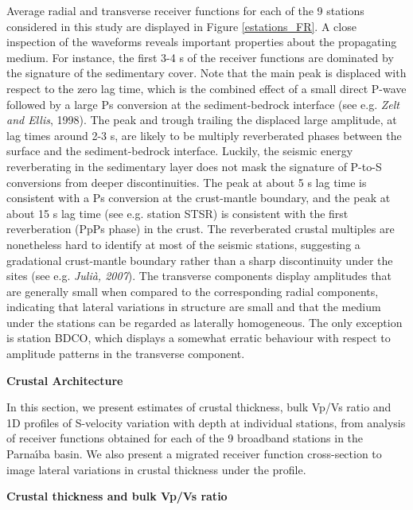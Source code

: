 \documentclass[manuscript,11pt]{geophysics}
\begin{document}
Average radial and transverse receiver functions for each of the 9 stations considered in this study are displayed in Figure \ref{estations_FR}. A close inspection of the waveforms reveals important properties about the propagating medium. For instance, the first 3-4 s of the receiver functions are dominated by the signature of the sedimentary cover. Note that the main peak is displaced with respect to the zero lag time, which is the combined effect of a small direct P-wave followed by a large Ps conversion at the sediment-bedrock interface (see e.g. \textit{Zelt and Ellis}, 1998). The peak and trough trailing the displaced large amplitude, at lag times around 2-3 s, are likely to be multiply reverberated phases between the surface and the sediment-bedrock interface. Luckily, the seismic energy reverberating in the sedimentary layer does not mask the signature of P-to-S conversions from deeper discontinuities. The peak at about 5 s lag time is consistent with a Ps conversion at the crust-mantle boundary, and the peak at about 15 s lag time (see e.g. station STSR) is consistent with the first reverberation (PpPs phase) in the crust. The reverberated crustal multiples are nonetheless hard to identify at most of the seismic stations, suggesting a gradational crust-mantle boundary rather than a sharp discontinuity under the sites (see e.g. \textit{Juli\`a, 2007}). The transverse components display amplitudes that are generally small when compared to the corresponding radial components, indicating that lateral variations in structure are small and that the medium under the stations can be regarded as laterally homogeneous. The only exception is station BDCO, which displays a somewhat erratic behaviour with respect to amplitude patterns in the transverse component.

\begin{flushleft}
\textbf{\LARGE Crustal Architecture}
\end{flushleft}

In this section, we present estimates of crustal thickness, bulk Vp/Vs ratio and 1D profiles of S-velocity variation with depth at individual stations, from analysis of receiver functions obtained for each of the 9 broadband stations in the Parna\'{\i}ba basin. We also present a migrated receiver function cross-section to image lateral variations in crustal thickness under the profile.

\begin{flushleft}
\textbf{Crustal thickness and bulk Vp/Vs ratio}
\end{flushleft}
\end{document}
